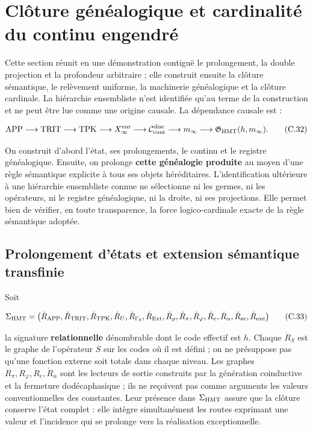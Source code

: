 \section{Clôture généalogique et cardinalité du continu engendré}
\label{sec:cierre-cardinal-nativo}

Cette section réunit en une démonstration contiguë le prolongement, la double projection et la profondeur arbitraire ; elle construit ensuite la clôture sémantique, le relèvement uniforme, la machinerie généalogique et la clôture cardinale. La hiérarchie ensembliste n'est identifiée qu'au terme de la construction et ne peut être lue comme une origine causale. La dépendance causale est :

\[
 \mathrm{APP}\longrightarrow\mathrm{TRIT}\longrightarrow\mathrm{TPK}
 \longrightarrow X_\infty^{\rm enr}
 \longrightarrow\mathcal C_{\rm cont}^{\rm disc}
 \longrightarrow m_\infty
 \longrightarrow\mathfrak G_{\rm HMT}(h,m_\infty).
\tag{C.32}\label{eq:ch-cadena-causal}
\]

On construit d’abord l’état, ses prolongements, le continu et le registre généalogique.
Ensuite, on prolonge \textbf{cette généalogie produite} au moyen d’une règle sémantique
explicite à tous ses objets héréditaires. L’identification ultérieure à
une hiérarchie ensembliste connue ne sélectionne ni les germes, ni les opérateurs,
ni le registre généalogique, ni la droite, ni ses projections. Elle permet bien de vérifier, en toute
transparence, la force logico-cardinale exacte de la règle sémantique adoptée.

\subsection{Prolongement d’états et extension sémantique transfinie}

Soit

\[
 \Sigma_{\rm HMT}
 =\bigl(\dot R_{\rm APP},\dot R_{\rm TRIT},\dot R_{\rm TPK},
 \dot R_{U},\dot R_{\Gamma_9},\dot R_{\rm Ext},\dot R_\rho,
 \dot R_{\pi},\dot R_{\varphi},\dot R_e,\dot R_{\alpha},
 \dot R_{\rm ar},\dot R_{\rm exc}\bigr)
\tag{C.33}\label{eq:ch-signatura}
\]

la signature \textbf{relationnelle} dénombrable dont le code effectif est \(h\). Chaque \(\dot R_S\) est le graphe de l'opérateur \(S\) sur les codes où il est défini ; on ne présuppose pas qu'une fonction externe soit totale dans chaque niveau. Les graphes \(\dot R_{\pi},\dot R_{\varphi},\dot R_e,\dot R_{\alpha}\) sont les lecteurs de sortie construits par la génération coinductive et la fermeture dodécaphasique ; ils ne reçoivent pas comme arguments les valeurs conventionnelles des constantes. Leur présence dans \(\Sigma_{\rm HMT}\) assure que la clôture conserve l'état complet : elle intègre simultanément les routes exprimant une valeur et l'incidence qui se prolonge vers la réalisation exceptionnelle.

